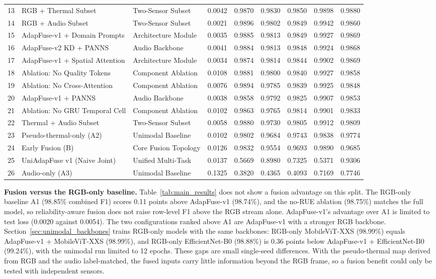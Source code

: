 \begin{table}[H]
{\begin{tabular}{@{}rllcccccc@{}}
13 & RGB + Thermal Subset & Two-Sensor Subset & 0.0042 & 0.9870 & 0.9830 & 0.9850 & 0.9898 & 0.9880 \\
14 & RGB + Audio Subset & Two-Sensor Subset & 0.0021 & 0.9896 & 0.9802 & 0.9849 & 0.9942 & 0.9860 \\
15 & AdapFuse-v1 + Domain Prompts & Architecture Module & 0.0035 & 0.9885 & 0.9813 & 0.9849 & 0.9927 & 0.9869 \\
16 & AdapFuse-v2 KD + PANNS & Audio Backbone & 0.0041 & 0.9884 & 0.9813 & 0.9848 & 0.9924 & 0.9868 \\
17 & AdapFuse-v1 + Spatial Attention & Architecture Module & 0.0034 & 0.9874 & 0.9814 & 0.9844 & 0.9902 & 0.9869 \\
18 & Ablation: No Quality Tokens & Component Ablation & 0.0108 & 0.9881 & 0.9800 & 0.9840 & 0.9927 & 0.9858 \\
19 & Ablation: No Cross-Attention & Component Ablation & 0.0076 & 0.9894 & 0.9785 & 0.9839 & 0.9925 & 0.9848 \\
20 & AdapFuse-v1 + PANNS & Audio Backbone & 0.0038 & 0.9858 & 0.9792 & 0.9825 & 0.9907 & 0.9853 \\
21 & Ablation: No GRU Temporal Cell & Component Ablation & 0.0102 & 0.9863 & 0.9765 & 0.9814 & 0.9901 & 0.9833 \\
22 & Thermal + Audio Subset & Two-Sensor Subset & 0.0058 & 0.9880 & 0.9730 & 0.9805 & 0.9912 & 0.9809 \\
23 & Pseudo-thermal-only (A2) & Unimodal Baseline & 0.0102 & 0.9802 & 0.9684 & 0.9743 & 0.9838 & 0.9774 \\
24 & Early Fusion (B) & Core Fusion Topology & 0.0126 & 0.9832 & 0.9554 & 0.9693 & 0.9890 & 0.9685 \\
25 & UniAdapFuse v1 (Naive Joint) & Unified Multi-Task & 0.0137 & 0.5669 & 0.8980 & 0.7325 & 0.5371 & 0.9306 \\
26 & Audio-only (A3) & Unimodal Baseline & 0.1325 & 0.3820 & 0.4365 & 0.4093 & 0.7169 & 0.7746 \\
\bottomrule
\end{tabular}%
}
\end{table}

\textbf{Fusion versus the RGB-only baseline.} Table~\ref{tab:main_results} does not show a fusion advantage on this split. The RGB-only baseline A1 (98.85\% combined F1) scores 0.11 points above AdapFuse-v1 (98.74\%), and the no-RUE ablation (98.75\%) matches the full model, so reliability-aware fusion does not raise row-level F1 above the RGB stream alone. AdapFuse-v1's advantage over A1 is limited to test loss (0.0020 against 0.0054). The two configurations ranked above A1 are AdapFuse-v1 with a stronger RGB backbone. Section~\ref{sec:unimodal_backbones} trains RGB-only models with the same backbones: RGB-only MobileViT-XXS (98.99\%) equals AdapFuse-v1 + MobileViT-XXS (98.99\%), and RGB-only EfficientNet-B0 (98.88\%) is 0.36 points below AdapFuse-v1 + EfficientNet-B0 (99.24\%), with the unimodal run limited to 12 epochs. These gaps are small single-seed differences. With the pseudo-thermal map derived from RGB and the audio label-matched, the fused inputs carry little information beyond the RGB frame, so a fusion benefit could only be tested with independent sensors.

